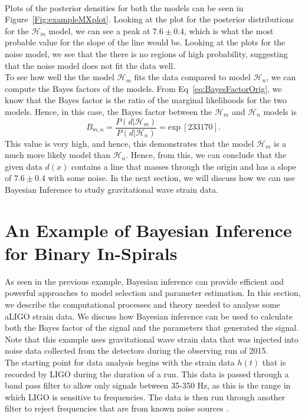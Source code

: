\documentclass{article}
\begin{document}
  \noindent $\text{ }$\\
 
  Plots of the posterior densities for both the models can be seen in Figure~\ref{Fig:exampleMXplot}. Looking at the plot for the posterior distributions for the $\mathcal{H}_{m}$ model, we can see a peak at $7.6\pm 0.4$, which is what the most probable value for the slope of the line would be. Looking at the plots for the noise model, we see that the there is no regions of high probability, suggesting that the noise model does not fit the data well. \\
 

To see how well the the model $\mathcal{H}_{m}$ fits the data compared to model $\mathcal{H}_{n}$, we can compute the Bayes factors of the models. From Eq~\ref{eq:BayesFactorOrig}, we know that the Bayes factor is the ratio of the marginal likelihoods for the two models. Hence, in this case, the Bayes factor between the $\mathcal{H}_{m}$ and $\mathcal{H}_{n}$ models is $$B_{m,n} = \frac{P(d|\mathcal{H}_{m})}{P(d|\mathcal{H}_{n})} = \text{exp}\ [233170].$$ This value is very high, and hence, this demonstrates that the model $\mathcal{H}_{m}$ is a much more likely model than $\mathcal{H}_{n}$. Hence, from this, we can conclude that the given data $d(x)$ contains a line that masses through the origin and has a slope of $7.6\pm 0.4$ with some noise. In the next section, we will discuss how we can use Bayesian Inference to study gravitational wave strain data.\\


 \section{An Example of Bayesian Inference for Binary In-Spirals}
 
 As seen in the previous example, Bayesian inference can provide efficient and powerful approaches to model selection and parameter estimation. In this section, we describe the computational processes and theory needed to analyse some aLIGO strain data. We discuss how Bayesian inference can be used to calculate both the Bayes factor of the signal and the parameters that generated the signal. Note that this example uses gravitational wave strain data that was injected into noise data collected from the detectors during the observing run of 2015.\\
 


The starting point for data analysis begins with the strain data $h(t)$ that is recorded by LIGO during the duration of a run. This data is passed through a band pass filter to allow only signals between 35-350 Hz, as this is the range in which LIGO is sensitive to frequencies. The data is then run through another filter to reject frequencies that are from known noise sources \cite{ligo2016properties}. \\
\end{document}
